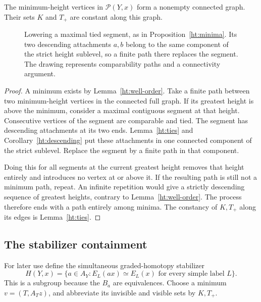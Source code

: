 \begin{proposition}
\label{ht:minima}
The minimum-height vertices in \(\mathcal P(Y,x)\) form a nonempty
connected graph.  Their sets \(K\) and \(T_+\) are constant along this
graph.
\end{proposition}

\begin{figure}[htbp]
\centering

\caption{Lowering a maximal tied segment, as in
Proposition~\ref{ht:minima}.  Its two descending attachments $a,b$
belong to the same component of the strict height sublevel, so a
finite path there replaces the segment.  The drawing represents
comparability paths and a connectivity argument.}
\label{fig:tied-path}
\end{figure}

\begin{proof}
A minimum exists by Lemma~\ref{ht:well-order}.
Take a finite path between two minimum-height vertices in the
connected full graph.
If its greatest height is above the minimum, consider a maximal
contiguous segment at that height.
Consecutive vertices of the segment are comparable and tied.
The segment has descending attachments at its two ends.
Lemma~\ref{ht:ties} and Corollary~\ref{ht:descending} put these attachments
in one connected component of the strict sublevel.
Replace the segment by a finite path in that component.

Doing this for all segments at the current greatest height removes
that height entirely and introduces no vertex at or above it.
If the resulting path is still not a minimum path, repeat.
An infinite repetition would give a strictly descending sequence of
greatest heights, contrary to Lemma~\ref{ht:well-order}.
The process therefore ends with a path entirely among minima.
The constancy of \(K,T_+\) along its edges is Lemma~\ref{ht:ties}.
\end{proof}

\subsection{The stabilizer containment}

For later use define the simultaneous graded-homotopy stabilizer
\begin{equation}
 H(Y,x)=\{a\in A_Y:
 E_L(ax)\simeq E_L(x)\text{ for every simple label }L\}.
 \label{ht:stabilizer}
\end{equation}
This is a subgroup because the \(B_a\) are equivalences.
Choose a minimum \(v=(T,A_Tz)\), and abbreviate its invisible and visible
sets by \(K,T_+\).

